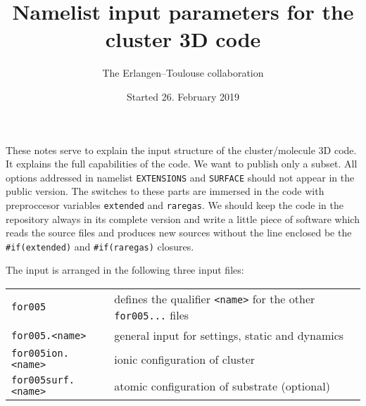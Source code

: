 \documentclass[12pt]{article}
\begin{document}
\title{Namelist input parameters for the cluster 3D code}
\author{The Erlangen--Toulouse collaboration}
\date{Started 26. February 2019}
\maketitle


These notes serve to explain the input structure of the
cluster/molecule 3D code. It explains the full capabilities of the
code. We want to publish only a subset.  All options addressed in
namelist {\tt EXTENSIONS} and {\tt SURFACE} should not appear in the
public version. The switches to these parts are immersed in the code
with preproccesor variables {\tt extended} and {\tt raregas}. We
should keep the code in the repository always in its complete version
and write a little piece of software which reads the source files and
produces new sources without the line enclosed be the
{\tt\#if(extended)} and {\tt\#if(raregas)} closures.

\bigskip


The input is arranged in the following three input files:
\\[-28pt]
\begin{center}
\begin{tabular}{ll}
\hline
 {\tt for005} & defines the qualifier {\tt <name>} for 
                the other {\tt for005...} files\\
 {\tt for005.<name>} & general input for settings, static and
 dynamics\\
 {\tt for005ion.<name>} & ionic configuration of cluster\\
 {\tt for005surf.<name>} & atomic configuration of substrate (optional)\\
\hline
\end{tabular}
\end{center}
\end{document}
